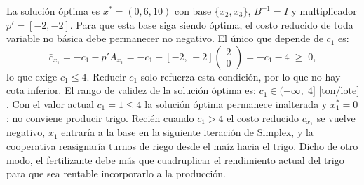 La solución óptima es $x^*=(0,6,10)$ con base $\{x_2,x_3\}$, $B^{-1}=I$ y multiplicador $p'=[-2,-2]$. Para que esta base siga siendo óptima, el costo reducido de toda variable no
básica debe permanecer no negativo. El único que depende de $c_1$ es:
\[
  \bar c_{x_1} = -c_1 - p' A_{x_1}
               = -c_1 - [-2,\,-2]\begin{pmatrix}
                   2 \\ 0
               \end{pmatrix}
               = -c_1 - 4 \;\ge\; 0,
\]
lo que exige $c_1\le 4$. Reducir $c_1$ solo refuerza esta condición, por lo que no hay cota inferior. El rango de validez de la solución óptima es: $\boxed{c_1\in(-\infty,\;4]\text{ [ton/lote]}}$. Con el valor actual $c_1=1\le 4$ la solución óptima permanece inalterada y $x_1^*=0$: no conviene producir trigo. Recién cuando $c_1>4$ el costo reducido $\bar c_{x_1}$ se vuelve negativo, $x_1$ entraría a la base en la siguiente iteración de Simplex, y la cooperativa reasignaría turnos de riego desde el maíz hacia el trigo. Dicho de otro modo, el fertilizante debe más que cuadruplicar el rendimiento actual del trigo para que sea rentable incorporarlo a la producción.\\

